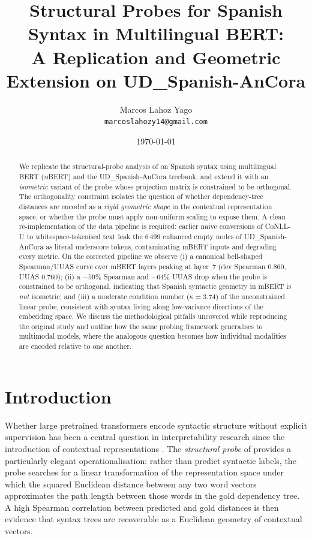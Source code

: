\documentclass[11pt,a4paper]{article}
\title{
  Structural Probes for Spanish Syntax in Multilingual BERT:\\
  A Replication and Geometric Extension on UD\_Spanish-AnCora
}
\author{
  Marcos Lahoz Yago\\
  \texttt{marcoslahozy14@gmail.com}
}
\date{\today}
\newcommand{\mbert}{\textsc{mBERT}\xspace}
\newcommand{\ancora}{UD\_Spanish-AnCora\xspace}
\newcommand{\layerbest}{7\xspace}
\begin{document}
\maketitle

\begin{abstract}
We replicate the structural-probe analysis of \citet{hewitt2019structural}
on Spanish syntax using multilingual BERT (\mbert) and the
\ancora treebank, and extend it with an \emph{isometric}
variant of the probe whose projection matrix is constrained to be
orthogonal. The orthogonality constraint isolates the question of
whether dependency-tree distances are encoded as a \emph{rigid geometric
shape} in the contextual representation space, or whether the probe
must apply non-uniform scaling to expose them.
A clean re-implementation of the data pipeline is required: earlier
naive conversions of CoNLL-U to whitespace-tokenised text leak the
6\,499 enhanced empty nodes of \ancora as literal underscore tokens,
contaminating mBERT inputs and degrading every metric.
On the corrected pipeline we observe (i) a canonical bell-shaped
Spearman/UUAS curve over mBERT layers peaking at layer~\layerbest
(dev Spearman $0.860$, UUAS $0.760$); (ii) a $-59\%$ Spearman and
$-64\%$ UUAS drop when the probe is constrained to be orthogonal,
indicating that Spanish syntactic geometry in mBERT is
\emph{not} isometric; and (iii) a moderate condition number
($\kappa = 3.74$) of the unconstrained linear probe, consistent with
syntax living along low-variance directions of the embedding space.
We discuss the methodological pitfalls uncovered while reproducing
the original study and outline how the same probing framework
generalises to multimodal models, where the analogous question becomes
how individual modalities are encoded relative to one another.
\end{abstract}

\section{Introduction}

Whether large pretrained transformers encode syntactic structure
without explicit supervision has been a central question in
interpretability research since the introduction of contextual
representations \citep{ethayarajh2019contextual}. The
\emph{structural probe} of \citet{hewitt2019structural} provides a
particularly elegant operationalisation: rather than predict syntactic
labels, the probe searches for a linear transformation of the
representation space under which the squared Euclidean distance
between any two word vectors approximates the path length between
those words in the gold dependency tree. A high Spearman correlation
between predicted and gold distances is then evidence that syntax
trees are recoverable as a Euclidean geometry of contextual vectors.
\end{document}

